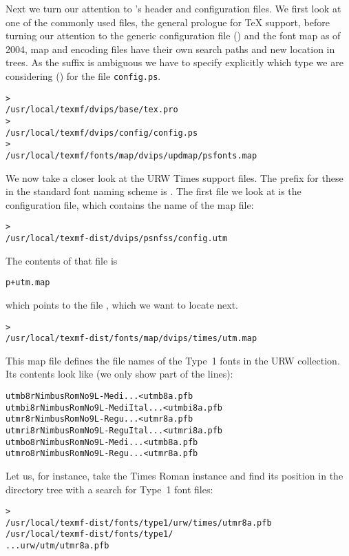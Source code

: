 \documentclass{article}
\begin{document}
Next we turn our attention to 's header and configuration
files.  We first look at one of the commonly used files, the general
prologue  for \TeX{} support, before turning our attention
to the generic configuration file () and the \PS{} font
map \Dash as of 2004, map and encoding files have
their own search paths and new location in  trees.  As
the  suffix is ambiguous we have to specify explicitly which
type we are considering () for the file
\texttt{config.ps}.
\begin{alltt}
> 
   /usr/local/texmf/dvips/base/tex.pro
> 
   /usr/local/texmf/dvips/config/config.ps
> 
   /usr/local/texmf/fonts/map/dvips/updmap/psfonts.map
\end{alltt}

We now take a closer look at the URW Times \PS{} support
files.  The prefix for these in the standard font naming scheme is
.  The first file we look at is the configuration file,
which contains the name of the map file:
\begin{alltt}
> 
   /usr/local/texmf-dist/dvips/psnfss/config.utm
\end{alltt}
The contents of that file is
\begin{alltt}
  p +utm.map
\end{alltt}
which points to the file , which we want to
locate next.
\begin{alltt}
> 
   /usr/local/texmf-dist/fonts/map/dvips/times/utm.map
\end{alltt}
This map file defines the file names of the Type~1 \PS{} fonts in
the URW collection.  Its contents look like (we only show part of the
lines):
\begin{alltt}
utmb8r  NimbusRomNo9L-Medi    ... <utmb8a.pfb
utmbi8r NimbusRomNo9L-MediItal... <utmbi8a.pfb
utmr8r  NimbusRomNo9L-Regu    ... <utmr8a.pfb
utmri8r NimbusRomNo9L-ReguItal... <utmri8a.pfb
utmbo8r NimbusRomNo9L-Medi    ... <utmb8a.pfb
utmro8r NimbusRomNo9L-Regu    ... <utmr8a.pfb
\end{alltt}
Let us, for instance, take the Times Roman instance
 and find its position in the  directory
tree with a search for Type~1 font files:
\begin{alltt}
> 
\ifSingleColumn   /usr/local/texmf-dist/fonts/type1/urw/times/utmr8a.pfb
\else   /usr/local/texmf-dist/fonts/type1/
... urw/utm/utmr8a.pfb
\fi\end{alltt}
\end{document}
